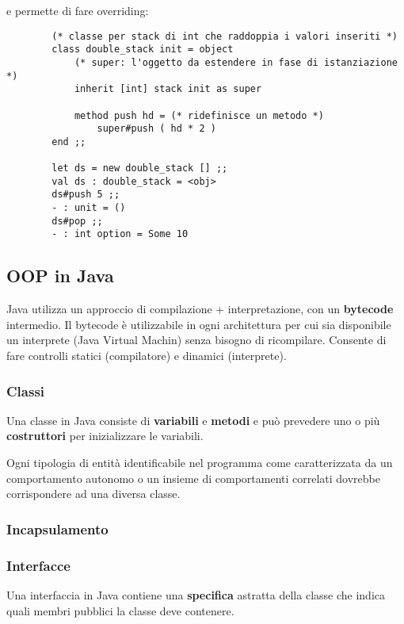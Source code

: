 e permette di fare overriding:
\begin{example}
	\begin{lstlisting}
		(* classe per stack di int che raddoppia i valori inseriti *)
		class double_stack init = object
			(* super: l'oggetto da estendere in fase di istanziazione *)
			inherit [int] stack init as super
			
			method push hd = (* ridefinisce un metodo *)
				super#push ( hd * 2 )
		end ;;
		
		let ds = new double_stack [] ;;
		val ds : double_stack = <obj>
		ds#push 5 ;;
		- : unit = ()
		ds#pop ;;
		- : int option = Some 10
	\end{lstlisting}
\end{example}

\subsection{OOP in Java}
Java utilizza un approccio di compilazione + interpretazione, con un \textbf{bytecode} intermedio. Il bytecode è utilizzabile in ogni architettura per cui sia disponibile un interprete (Java Virtual Machin) senza bisogno di ricompilare. Consente di fare controlli statici (compilatore) e dinamici (interprete).
\subsubsection{Classi}
Una classe in Java consiste di \textbf{variabili} e \textbf{metodi} e può prevedere uno o più \textbf{costruttori} per inizializzare le variabili.
\begin{definition}
	Ogni tipologia di entità identificabile nel programma come caratterizzata da un comportamento autonomo o un insieme di comportamenti correlati dovrebbe corrispondere ad una diversa classe.
\end{definition}

\subsubsection{Incapsulamento}

\subsubsection{Interfacce}
Una interfaccia in Java contiene una \textbf{specifica} astratta della classe che indica quali membri pubblici la classe deve contenere.


